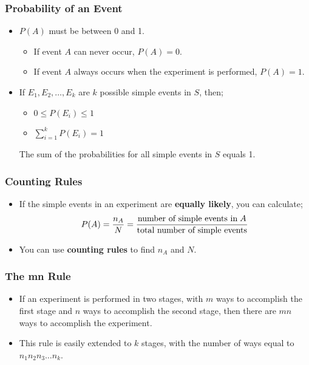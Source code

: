 \documentclass[12pt, letterpaper]{article}
\begin{document}
            \subsubsection{Probability of an Event}
                \begin{itemize}
                    \item $P(A)$ must be between 0 and 1.
                        \begin{itemize}
                            \item If event $A$ can never occur, $P(A) = 0$.
                            \item If event $A$ always occurs when the experiment is performed, $P(A) = 1$.
                        \end{itemize}
                    \item If $E_1, E_2,\dots, E_k$ are $k$ possible simple events in $S$, then;
                        \begin{itemize}
                            \item $0 \leq P(E_i) \leq 1$
                            \item $\sum_{i = 1}^k P(E_i) = 1$
                        \end{itemize}
                        The sum of the probabilities for all simple events in $S$ equals 1.
                \end{itemize}
            \subsubsection{Counting Rules}
                \begin{itemize}
                    \item If the simple events in an experiment are \textbf{equally likely}, you can calculate;
                        \begin{equation}
                            P(A) = \frac{n_A}{N} = \frac{\textnormal{number of simple events in}\hspace{1mm}A}{\textnormal{total number of simple events}}
                        \end{equation}
                    \item You can use \textbf{counting rules} to find $n_A$ and $N$.
                \end{itemize}
            \subsubsection{The mn Rule}
                \begin{itemize}
                    \item If an experiment is performed in two stages, with $m$ ways to accomplish the first stage and $n$ ways to accomplish the second stage, then there are $mn$ ways to accomplish the experiment.
                    \item This rule is easily extended to $k$ stages, with the number of ways equal to $n_1n_2n_3\dots n_k$.
                \end{itemize}
\end{document}
